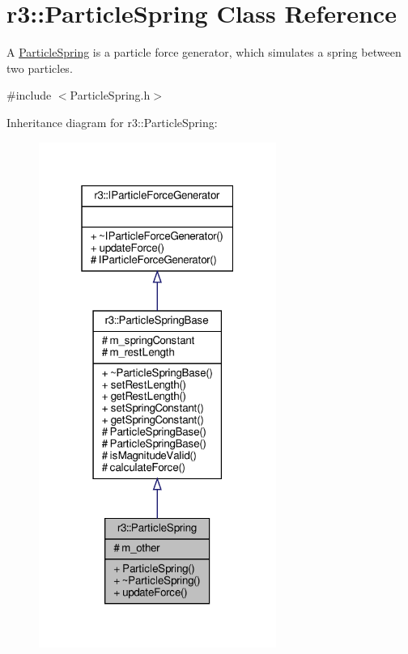 \hypertarget{classr3_1_1_particle_spring}{}\section{r3\+:\+:Particle\+Spring Class Reference}
\label{classr3_1_1_particle_spring}


A \mbox{\hyperlink{classr3_1_1_particle_spring}{Particle\+Spring}} is a particle force generator, which simulates a spring between two particles.  




{\ttfamily \#include $<$Particle\+Spring.\+h$>$}



Inheritance diagram for r3\+:\+:Particle\+Spring\+:\nopagebreak
\begin{figure}[H]
\begin{center}
\leavevmode
\includegraphics[width=220pt]{classr3_1_1_particle_spring__inherit__graph}
\end{center}
\end{figure}


